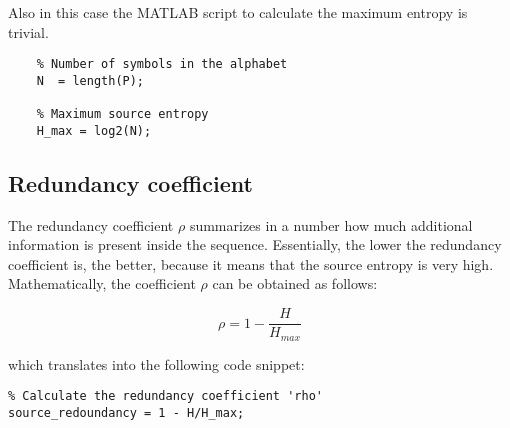 Also in this case the MATLAB script to calculate the maximum entropy is trivial.

\begin{lstlisting}
    % Number of symbols in the alphabet
    N  = length(P);

    % Maximum source entropy
    H_max = log2(N);
\end{lstlisting}


% 
\subsection{Redundancy coefficient}

The redundancy coefficient $\rho$ summarizes in a number how much additional information is present inside the sequence. Essentially, the lower the redundancy coefficient is, the better, because it means that the source entropy is very high. Mathematically, the coefficient $\rho$ can be obtained as follows:

\begin{equation*}
    \rho = 1 - \frac{H}{H_{max}}    
\end{equation*}

\noindent which translates into the following code snippet:

\begin{lstlisting}
% Calculate the redundancy coefficient 'rho'
source_redoundancy = 1 - H/H_max;
\end{lstlisting}





